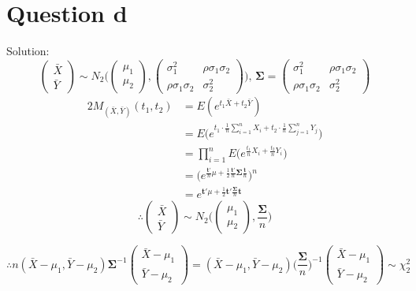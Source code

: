 \documentclass[a4papers]{ctexart}
\begin{document}
\section*{Question d}
\noindent Solution:
\[\begin{pmatrix}\bar{X}\\\bar{Y}\end{pmatrix} \sim 
    N_2\Bigg(\begin{pmatrix}\mu_1\\\mu_2\end{pmatrix},
        \begin{pmatrix}\sigma_1^2 & \rho \sigma_{1}\sigma_{2} \\ \rho \sigma_{1}\sigma_{2} & \sigma_2^2\end{pmatrix} \Bigg),\,
  \boldsymbol{\Sigma} = \begin{pmatrix}\sigma_1^2 & \rho \sigma_{1}\sigma_{2} \\ \rho \sigma_{1}\sigma_{2} & \sigma_2^2\end{pmatrix}
\]
\begin{alignat*}{2}
    M_{(\bar{X},\bar{Y})}(t_1,t_2)&=E(e^{t_1\bar{X}+t_2 \bar{Y}})\\
    &=E\Big(e^{t_1 \cdot \frac{1}{n}\sum_{i=1}^{n}X_i+t_2 \cdot \frac{1}{n}\sum_{j=1}^{n}Y_j } \Big)\\
    &=\prod_{i=1}^{n}E\Big(e^{\frac{t_1}{n}X_i+\frac{t_2}{n}Y_i}\Big)\\
    &=\Big(e^{\frac{\boldsymbol{t}'}{n}\mu+\frac{1}{2}\frac{\boldsymbol{t}'}{n} {\boldsymbol{\Sigma}} \frac{\boldsymbol{t}}{n}}\Big)^n\\
    &=e^{\boldsymbol{t}'\mu+ \frac{1}{2}\boldsymbol{t}'  \frac{\boldsymbol{\Sigma}}{n} \boldsymbol{t} }
\end{alignat*}
\[ \therefore \begin{pmatrix}\bar{X}\\\bar{Y}\end{pmatrix} \sim  
    N_2\Bigg( \begin{pmatrix}\mu_1\\\mu_2\end{pmatrix},\dfrac{\boldsymbol{\Sigma}}{n}  \Bigg)\]

\[ \therefore n(\bar{X}-\mu_1,\bar{Y}-\mu_2)\boldsymbol{\Sigma}^{-1}\begin{pmatrix}\bar{X}-\mu_1 \\ \bar{Y}-\mu_2 \end{pmatrix} 
 = (\bar{X}-\mu_1,\bar{Y}-\mu_2) \Big( \dfrac{\boldsymbol{\Sigma}}{n}\Big)^{-1}  \begin{pmatrix}\bar{X}-\mu_1 \\ \bar{Y}-\mu_2 \end{pmatrix} 
 \sim \chi_2^2
    \]
\end{document}
